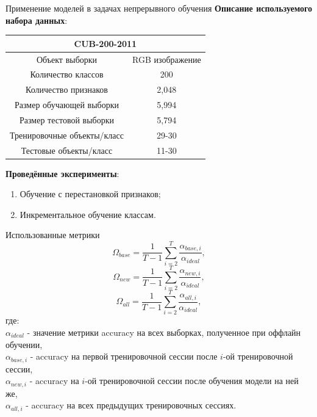\documentclass{beamer}
\begin{document}
\begin{frame}{Применение моделей в задачах непрерывного обучения}
  \textbf{Описание используемого набора данных}:
  \begin{table}[h!]
      \begin{center}
          \begin{tabular}{ |c|c|  }
              \hline
              \multicolumn{2}{|c|}{CUB-200-2011} \\
              \hline
              Объект выборки & RGB изображение \\
              \hline
              Количество классов & 200 \\
              \hline
              Количество признаков & 2,048 \\
              \hline
              Размер обучающей выборки & 5,994 \\
              \hline
              Размер тестовой выборки & 5,794 \\
              \hline
              Тренировочные объекты/класс & 29-30 \\
              \hline
              Тестовые объекты/класс & 11-30 \\
              \hline
          \end{tabular}
      \end{center}
  \end{table}
  \textbf{Проведённые эксперименты}:
  \begin{enumerate}
    \item Обучение с перестановкой признаков;
    \item Инкрементальное обучение классам.
  \end{enumerate}
\end{frame}

\begin{frame}{Использованные метрики}
  \vspace{-15pt}
  \begin{equation*}
    \Omega_{base}=\frac{1}{T-1}\sum_{i=2}^{T}\frac{\alpha_{base,i}}{\alpha_{ideal}},
  \end{equation*}
  \begin{equation*}
    \Omega_{new}=\frac{1}{T-1}\sum_{i=2}^{T}\frac{\alpha_{new,i}}{\alpha_{ideal}},
  \end{equation*}
  \begin{equation*}
    \Omega_{all}=\frac{1}{T-1}\sum_{i=2}^{T}\frac{\alpha_{all,i}}{\alpha_{ideal}},
  \end{equation*}
  где:\\
  \(\alpha_{ideal}\) - значение метрики accuracy на всех выборках, полученное при
  оффлайн обучении,\\
  \(\alpha_{base,i}\) - accuracy на первой тренировочной сессии
  после \(i\)-ой тренировочной сессии,\\
  \(\alpha_{new,i}\) - accuracy на \(i\)-ой тренировочной сессии
  после обучения модели на ней же,\\
  \(\alpha_{all,i}\) - accuracy на всех предыдущих тренировочных сессиях.
\end{frame}
\end{document}

